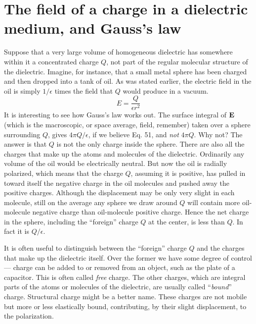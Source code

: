 \section[Charge in a dielectric]{The field of a charge in a dielectric medium, and Gauss's law}

Suppose that a very large volume of homogeneous dielectric has
somewhere within it a concentrated charge $Q$, not part of the regular
molecular structure of the dielectric. Imagine, for instance, that a
small metal sphere has been charged and then dropped into a tank
of oil. As was stated earlier, the electric field in the oil is simply $1/\epsilon$
times the field that $Q$ would produce in a vacuum.
\begin{equation}
  E = \frac{Q}{\epsilon r^2}
\end{equation}
It is interesting to see how Gauss's law works out. The surface integral
of $\mathbf{E}$ (which is the macroscopic, or space average, field, 
remember) taken over a sphere surrounding $Q$, gives $4\pi Q/\epsilon$, if we believe
Eq. 51, and \emph{not} $4\pi Q$. Why not? The answer is that $Q$ is not the only
charge inside the sphere. There are also all the charges that make up
the atoms and molecules of the dielectric. Ordinarily any volume
of the oil would be electrically neutral. But now the oil is radially
polarized, which means that the charge $Q$, assuming it is positive, has
pulled in toward itself the negative charge in the oil molecules and
pushed away the positive charges. Although the displacement may
be only very slight in each molecule, still on the average any sphere
we draw around $Q$ will contain more oil-molecule negative charge
than oil-molecule positive charge. Hence the net charge in the
sphere, including the ``foreign'' charge $Q$ at the center, is less than $Q$.
In fact it is $Q/\epsilon$.

It is often useful to distinguish between the ``foreign'' charge $Q$
and the charges that make up the dielectric itself. Over the former
we have some degree of control --- charge can be added to or removed
from an object, such as the plate of a capacitor. This is often called
\emph{free} charge.
The other charges, which are integral parts of the atoms
or molecules of the dielectric, are usually 
called ``\emph{bound}'' charge.
Structural charge might be a better name. These charges are not
mobile but more or less elastically bound, contributing, by their
slight displacement, to the polarization.

